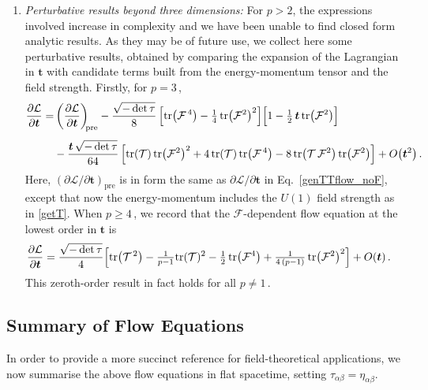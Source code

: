 \documentclass[11pt]{article}
\newcommand{\CF}{\mathcal{F}}
\newcommand{\CL}{\mathcal{L}}
\newcommand{\CT}{\mathcal{T}}
\newcommand{\p}{\partial}
\newcommand{\tr}{\text{tr}}
\renewcommand{\emph}[1]{\textit{#1}}
\newcommand{\lambdap}{\boldsymbol{t}}
\begin{document}
\begin{enumerate}[(1)]
\item \emph{Perturbative results beyond three dimensions:} 
For $p>2$, the expressions involved increase in complexity and we have been unable to find closed form analytic results.
As they may be of future use, we collect here some perturbative results, obtained by comparing the expansion of the Lagrangian in $\lambdap$ with candidate terms built from the energy-momentum tensor and the field strength.
Firstly, for
$p = 3$\,,
%
\begin{align} \label{eq:fept}
    \frac{\p \CL}{\p \lambdap} = & \left( \frac{\p \CL}{\p \lambdap} \right)_\text{\!\!pre} 
    - \frac{\sqrt{-\det \tau}}{8} \, \Bigl[ \tr \bigl( \CF^{\,4} \bigr) - \tfrac{1}{4} \, \tr\bigl( \CF^2 \bigr)^2 \Bigr] \Bigl[ 1 - \tfrac{1}{2} \, \lambdap \, \tr\bigl( \CF^2 \bigr) \Bigr] \\[4pt]
    & - \frac{\lambdap \, \sqrt{-\det \tau}}{64} \, \Bigl[ \tr(\CT) \,  \tr\bigl(\CF^2\bigr)^2 + 4 \, \tr(\CT) \, \tr\bigl(\CF^{\,4}\bigr) - 8 \, \tr\bigl(\CT \, \CF^2\bigr) \, \tr\bigl(\CF^2\bigr) \Bigr] + O\bigl(\lambdap^2\bigr)\,. \notag
\end{align}
%
Here, $(\p \CL / \p \lambdap )_\text{pre}$ is in form the same as $\p \CL / \p \lambdap$ in Eq.~\eqref{genTTflow_noF}, except that now the energy-momentum includes the $U(1)$ field strength as in \eqref{getT}.
When $p \geq 4$\,, we record that the $\CF$-dependent flow equation at the lowest order in $\lambdap$ is
%
\begin{align} \label{eq:fehp}
\begin{split}
    \frac{\p \CL}{\p \lambdap} &= \frac{\sqrt{-\det \tau}}{4} \Bigl[ \tr\bigl(\CT^{\,2}\bigr) - \tfrac{1}{p-1} \tr(\CT)^2 - \tfrac{1}{2} \, \tr\bigl(\CF^4\bigr) + \tfrac{1}{4 \, (p-1)} \, \tr\bigl(\CF^2\bigr)^2 \Bigr] + O(\lambdap)\,.
\end{split}
\end{align}
%
This zeroth-order result in fact holds for all $p \neq 1$\,. 

\end{enumerate}



\subsection*{Summary of Flow Equations} 

In order to provide a more succinct reference for field-theoretical applications, we now summarise the above flow equations in flat spacetime, setting $\tau_{\alpha \beta} = \eta_{\alpha \beta}$.
\end{document}
